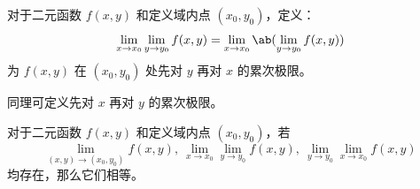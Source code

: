 \begin{definition}
    对于二元函数 $f(x, y)$ 和定义域内点 $(x_0, y_0)$，定义：
    $$
    \lim_{x \to x_0} \lim_{y \to y_0} f(x, y) = \lim_{x \to x_0} \ab(\lim_{y \to y_0} f(x, y))
    $$
    为 $f(x, y)$ 在 $(x_0, y_0)$ 处先对 $y$ 再对 $x$ 的累次极限。

    同理可定义先对 $x$ 再对 $y$ 的累次极限。
\end{definition}

\begin{theorem}
    对于二元函数 $f(x, y)$ 和定义域内点 $(x_0, y_0)$，若
    $$
    \lim_{(x, y) \to (x_0, y_0)} f(x, y),\ \lim_{x \to x_0} \lim_{y \to y_0} f(x, y),\ \lim_{y \to y_0} \lim_{x \to x_0} f(x, y)
    $$
    均存在，那么它们相等。
\end{theorem}